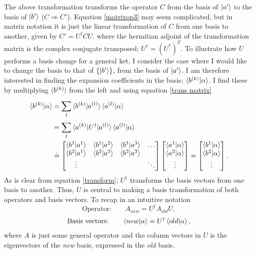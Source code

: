 The above transformation transforms the operator $C$ from the basis of $\ket{a'}$ to the basis of $\ket{b'}$ ($C\Rightarrow C'$). Equation \eqref{matrixop3} may seem complicated, but in matrix notation it is just the linear transformation of $C$ from one basis to another, given by $C'=U^\dagger CU$. where the hermitian adjoint of the transformation matrix is the complex conjugate transposed; $U^\dagger=(U^*)^T$.\newline 
To illustrate how $U$ performs a basis change for a general ket, I consider the case where I would like to change the basis to that of $\{\ket{b'}\}$, from the basis of $\ket{a'}$. I am therefore interested in finding the expansion coefficients in the basis; $\braket{b^{(k)}|\alpha}$. I find these by multiplying $\bra{b^{(k)}}$ from the left and using equation \eqref{trans matrix}
\begin{equation}
	\begin{split}
		\braket{b^{(k)}|\alpha}&
		=\sum_{l}^{}\braket{b^{(k)}|a^{(l)}}\braket{a^{(l)}|\alpha}\\
		&=\sum_{l}^{}\braket{a^{(k)}|U^\dagger|a^{(l)}}\braket{a^{(l)}|\alpha}\\
		&\doteq\begin{bmatrix}
			\braket{b^1|a^1} & \braket{b^1|a^2} & \braket{b^1|a^3} & \dots\\
			\braket{b^2|a^1} & \braket{b^2|a^2} & \braket{b^2|a^3} & \\
			\vdots &  &  & \ddots \\
		\end{bmatrix}\begin{bmatrix}
			\braket{a^1|\alpha} \\
			\braket{a^2|\alpha}\\
			\vdots \\
		\end{bmatrix}
		=\begin{bmatrix}
			\braket{b^1|\alpha} \\
			\braket{b^2|\alpha}\\
			\vdots \\
		\end{bmatrix}.
	\end{split}
	\label{transform}
\end{equation} 
As is clear from equation \eqref{transform}; $U^\dagger$ transforms the basis vectors from one basis to another. Thus, $U$ is central to making a basis transformation of both operators and basis vectors. To recap in an intuitive notation
\begin{equation}
	\mbox{Operator:}\qquad A_{new}=U^\dagger A_{old}U,
\end{equation} 
\begin{equation}
	\mbox{Basis vectors:}\qquad\braket{new|\alpha}=U^\dagger\braket{old|\alpha},
\end{equation} 
where $A$ is just some general operator and the column vectors in $U$ is the eigenvectors of the \emph{new} basis, expressed in the \emph{old} basis.

